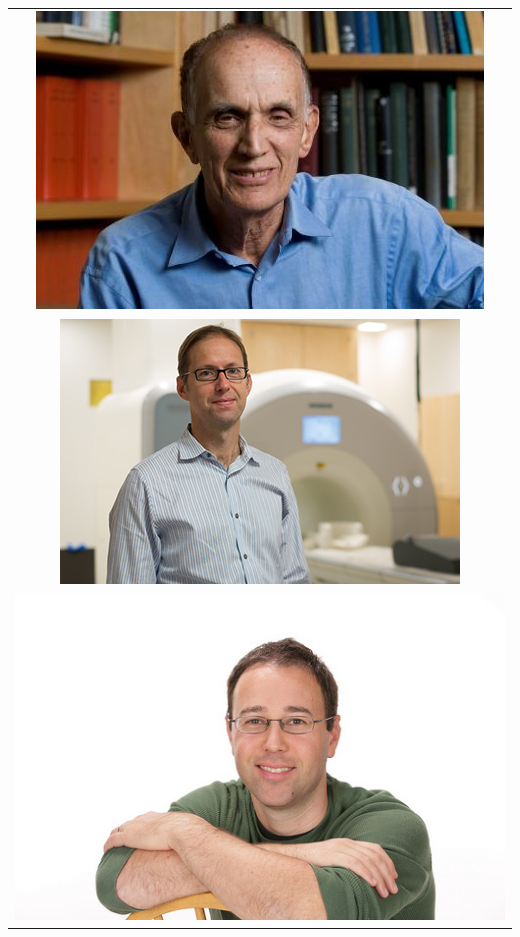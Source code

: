 \documentclass{beamer}
\begin{document}
\begin{frame}
\begin{center}
\begin{tabular}{c}
\includegraphics[scale = 0.8]{2014_Efron-indoors.jpg}\\
\includegraphics[scale = 0.19]{poldrack_photo2_400.jpg}\\
\includegraphics[scale = 0.19]{tsachypic.jpg}
\end{tabular}
\end{center}
\end{frame}
\end{document}
